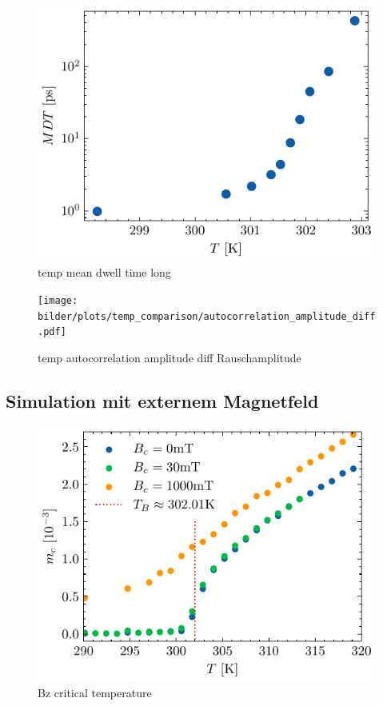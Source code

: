 \documentclass[main.tex]{subfiles}
\begin{document}
\begin{figure}[H]
    \centering
    \includegraphics{bilder/plots/temp_comparison_long/mean_dwell_time.pdf}
    \caption{temp mean dwell time long}\label{fig:temp-mdt-long}
\end{figure}


\begin{figure}[H]
    \centering
    \texttt{[image: bilder/plots/temp\_comparison/autocorrelation\_amplitude\_diff.pdf]}
    \caption{temp autocorrelation amplitude diff Rauschamplitude}\label{fig:temp-autocorr-amplitude-diff}
\end{figure}

\subsection{Simulation mit externem Magnetfeld}

\begin{figure}[H]
    \centering
    \includegraphics{bilder/plots/Bz_comparison/critical_temperature.pdf}
    \caption{Bz critical temperature }\label{fig:bz-crit-temp}
\end{figure}
\end{document}
